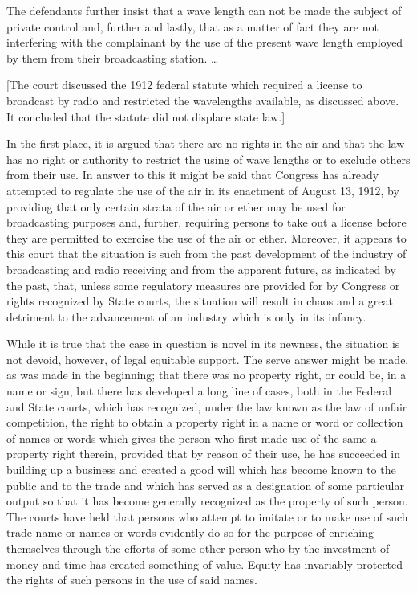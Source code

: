 The defendants further insist that a wave length can not be made the
subject of private control and, further and lastly, that as a matter of fact
they are not interfering with the complainant by the use of the present wave
length employed by them from their broadcasting station. \ldots

[The court discussed the 1912 federal statute which required a license to
broadcast by radio and restricted the wavelengths available, as discussed
above. It concluded that the statute did not displace state law.]

In the first place, it is argued that there are no rights in the air and that
the law has no right or authority to restrict the using of wave lengths or to
exclude others from their use. In answer to this it might be said that Congress
has already attempted to regulate the use of the air in its enactment of August
13, 1912, by providing that only certain strata of the air or ether may be used
for broadcasting purposes and, further, requiring persons to take out a
license before they are permitted to exercise the use of the air or ether.
Moreover, it appears to this court that the situation is such from the past
development of the industry of broadcasting and radio receiving and from the
apparent future, as indicated by the past, that, unless some regulatory
measures are provided for by Congress or rights recognized by State courts, the
situation will result in chaos and a great detriment to the advancement of an
industry which is only in its infancy.

While it is true that the case in question is novel in its newness, the
situation is not devoid, however, of legal equitable support. The serve answer
might be made, as was made in the beginning; that there was no property right,
or could be, in a name or sign, but there has developed a long line of cases,
both in the Federal and State courts, which has recognized, under the law known
as the law of unfair competition, the right to obtain a property right in a
name or word or collection of names or words
which gives the person who first made use of the same a property right therein,
provided that by reason of their use, he has succeeded in building up a
business and created a good will which has become known to the public and to
the trade and which has served as a designation of some particular output so
that it has become generally recognized as the property of such person. The
courts have held that persons who attempt to imitate or to make use of such
trade name or names or words evidently do so for the purpose of enriching
themselves through the efforts of some other person who by the investment of
money and time has created something of value. Equity has invariably protected
the rights of such persons in the use of said names.

